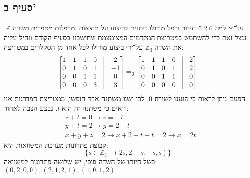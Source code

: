 \documentclass[a4paper, 10pt]{article}
\begin{document}
\begin{hebrew}
	\subsection{סעיף ב'}
	על־פי למה 5.2.6 חיבור וכפל מודולו ניתנים לביצוע
	על תוצאות ומכפלות מספרים משדה $\mathbb{Z}$.
	ננצל זאת כדי להשתמש במטריצת המקדמים המצומצמת שחישבנו
	בסעיף הקודם ונחיל עליה את השדה $\mathbb{Z}_3$ על־ידי ביצוע מודולו
	לכל אחד מן הסקלרים במטריצה:
	\[
		\begin{bmatrix}
			1 & 1 & 1 & 0 & \vline & 2 \\
			0 & 1 & 0 & 1 & \vline & -1 \\
			0 & 0 & 1 & 1 & \vline & 0 \\
			0 & 0 & 0 & 3 & \vline & 3
		\end{bmatrix}
		\equiv_3
		\begin{bmatrix}
			1 & 1 & 1 & 0 & \vline & 2 \\
			0 & 1 & 0 & 1 & \vline & 2 \\
			0 & 0 & 1 & 1 & \vline & 0 \\
			0 & 0 & 0 & 0 & \vline & 0
		\end{bmatrix}
	\]
	הפעם ניתן לראות כי הגענו לשורת $0$,
	לכן ישנו משתנה אחד חופשי,
	ממטריצת המדרגות אנו רואים כי משתנה זה הוא $t$.
	נבצע הצבה לאחור:
	\[
		\begin{aligned}
			& z + t = 0 \rightarrow z = -t \\
			& y + t = 2 \rightarrow y = 2 - t \\
			& x + y + z = 2 \rightarrow x + 2 - t - t = 2 \rightarrow x = 2t
		\end{aligned}
	\]
	קבוצת פתרונות מערכת המשוואות היא:
	\[
		\{ s \in \mathbb{Z}_3 \mid (2s, 2 - s, -s, s) \}
	\]
	בשל היותו של השדה סופי, יש שלושה פתרונות למשוואה:
	$(0, 2, 0, 0), (2, 1, 2, 1), (1, 0, 1, 2)$


\end{hebrew}
\end{document}
